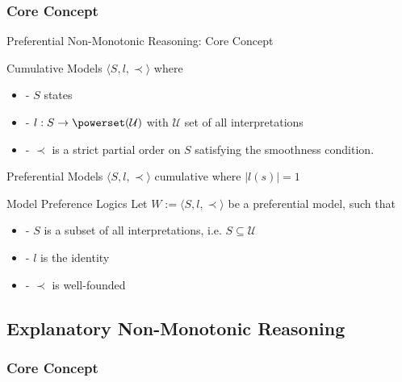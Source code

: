 \documentclass[8pt]{beamer}
\newcommand{\myfootnote}[1]{
    \renewcommand{\thefootnote}{}
    \footnotetext{\hspace{-4pt}\scriptsize#1}
    \renewcommand{\thefootnote}{\arabic{footnote}}
}
\begin{document}
\subsubsection{Core Concept}
\begin{frame}{Preferential Non-Monotonic Reasoning: Core Concept}
\begin{block}{Cumulative Models}
$\langle S,l, \prec \rangle$ where 
\begin{itemize}
\item  - $S$ states
\item  - $l:S \to \powerset(\mathcal{U})$ with $\mathcal{U}$ set of all interpretations
\item  - $\prec$ is a strict partial order on $S$ satisfying the smoothness condition.
\end{itemize} 
\end{block}

\begin{block}{Preferential Models}
$\langle S,l, \prec \rangle$ cumulative where $|l(s)|=1$
\end{block}
\begin{block}{Model Preference Logics}
Let $W:=\langle S,l, \prec \rangle$ be a preferential model, such that 
\begin{itemize}
\item - $S$ is a subset of all interpretations, i.e. $S \subseteq \mathcal{U}$ 
\item - $l$ is the identity
\item - $\prec$ is well-founded
\end{itemize}
\end{block}
\myfootnote{\cite{kraus1990nonmonotonic,brewka1997nonmonotonic}}
\end{frame}
\subsection{Explanatory Non-Monotonic Reasoning}

\subsubsection{Core Concept}
\end{document}
